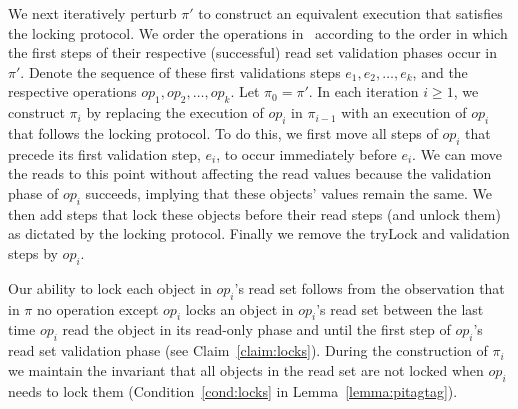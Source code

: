 We next iteratively perturb $\pi'$ to construct an equivalent execution that satisfies the locking protocol.
We order the operations in \op\ according to the order in which the first steps of their 
respective (successful) read set validation phases occur in $\pi'$.
Denote the sequence of these first validations steps $e_1, e_2, \ldots, e_k$, and the respective operations
$op_1, op_2, \ldots, op_k$. Let $\pi_0 = \pi'$. 
In each iteration $i \geq 1$, we construct $\pi_i$ by replacing the execution of $op_i$
in $\pi_{i-1}$ with an execution of $op_i$ that follows the locking protocol. To do this, we first move all steps of $op_i$ that precede 
its first validation step, $e_i$, to occur immediately before $e_i$. We can move the reads to this point without affecting the read
values because the validation phase of $op_i$ succeeds, implying that these objects' values remain the same. 
 We then add steps that lock these objects before their read steps (and unlock
them) as dictated by the locking protocol.
Finally we remove the tryLock and validation steps by $op_i$. 

Our ability to lock each object in $op_i$'s read set follows from the
observation that in $\pi$ no operation except $op_i$ locks an object in $op_i$'s
read set between the last time $op_i$ read the object in its
read-only phase and until the first step of $op_i$'s read set validation phase
(see Claim~\ref{claim:locks}). During the construction of $\pi_i$ we maintain
the invariant that all objects in the read set are not locked when $op_i$ needs to lock
them (Condition~\ref{cond:locks} in Lemma~\ref{lemma:pitagtag}).


